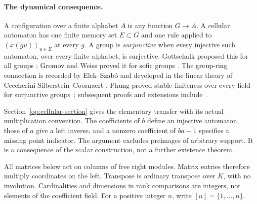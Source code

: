 \paragraph{The dynamical consequence.}
A configuration over a finite alphabet $A$ is any function $G\to A$.
A cellular automaton has one finite memory set $E\subset G$ and one
rule applied to $(x(gu))_{u\in E}$ at every $g$. A group is
\emph{surjunctive} when every injective such automaton, over every finite
alphabet, is surjective. Gottschalk proposed this for all groups
\cite{Gottschalk1973}; Gromov and Weiss proved it for sofic groups
\cite{Gromov1999,Weiss2000}. The group-ring connection is recorded by
Elek--Szab\'o and developed in the linear theory of
Ceccherini-Silberstein--Coornaert
\cite{ElekSzabo2004,CSCCoornaert2006}. Phung proved stable finiteness
over every field for surjunctive groups~\cite[Theorem~B]{Phung2023};
subsequent proofs and extensions include~\cite{CSCPhungGroup2025,CSCPhungMonoid2025}.

Section~\ref{op:cellular-section} gives the elementary transfer with its
actual multiplication convention. The coefficients of $b$ define an
injective automaton, those of $a$ give a left inverse, and a nonzero
coefficient of $ba-1$ specifies a missing point indicator. The argument
excludes preimages of arbitrary support. It is a consequence of the
scalar construction, not a further existence theorem.

All matrices below act on columns of free right modules. Matrix entries
therefore multiply coordinates on the left. Transpose is ordinary
transpose over $K$, with no involution. Cardinalities and dimensions in
rank comparisons are integers, not elements of the coefficient field.
For a positive integer $n$, write $[n]=\{1,\ldots,n\}$.
